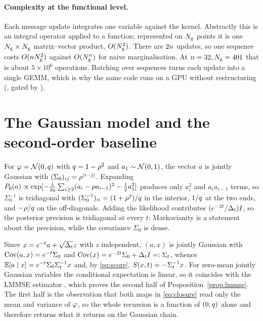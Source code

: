 \paragraph{Complexity at the functional level.} Each message update integrates one variable
against the kernel. Abstractly this is an integral operator applied to a function; represented on
$N_{\mathrm{g}}$ points it is one $N_{\mathrm{g}}\times N_{\mathrm{g}}$ matrix--vector product, $O(N_{\mathrm{g}}^2)$. There are
$2n$ updates, so one sequence costs $O(nN_{\mathrm{g}}^2)$ against $O(N_{\mathrm{g}}^{n})$ for
naive marginalisation. At $n=32,N_{\mathrm{g}}=401$ that is about $5\times10^6$ operations.
Batching over sequences turns each update into a single GEMM, which is why the same code runs on
a GPU without restructuring (, gated by
).

\section{The Gaussian model and the second-order baseline}
\label{app:lmmse}

For $\varphi=\mathcal{N}\!\left(0,q\right)$ with $q=1-\rho^2$ and $a_1\sim\mathcal{N}\!\left(0,1\right)$, the vector $a$
is jointly Gaussian with $(\Sigma_0)_{ij}=\rho^{|i-j|}$. Expanding
$P_0(a)\propto\exp[-\tfrac{1}{2q}\sum_{i\ge2}(a_i-\rho a_{i-1})^2 - \tfrac12 a_1^2]$
produces only $a_i^2$ and $a_ia_{i-1}$ terms, so $\Sigma_0^{-1}$ is tridiagonal with
$(\Sigma_0^{-1})_{ii} = (1+\rho^2)/q$ in the interior, $1/q$ at the two ends, and
$-\rho/q$ on the off-diagonals. Adding the likelihood contributes $(e^{-2t}/\Delta_t)I$, so the
posterior precision is tridiagonal at every $t$: Markovianity is a statement about the precision,
while the covariance $\Sigma_0$ is dense.

Since $x = e^{-t}a + \sqrt{\Delta_t}z$ with $z$ independent, $(a,x)$ is jointly Gaussian with
$\operatorname{Cov}(a,x) = e^{-t}\Sigma_0$ and $\operatorname{Cov}(x) = e^{-2t}\Sigma_0 + \Delta_t I =: \Sigma_t$, whence
$\mathbb{E}[a\mid x] = e^{-t}\Sigma_0\Sigma_t^{-1}x$ and, by \eqref{eq:score},
$S(x,t) = -\Sigma_t^{-1}x$. For zero-mean jointly Gaussian variables the conditional
expectation is linear, so it coincides with the LMMSE estimator \citep{kay1993}, which proves the
second half of Proposition~\ref{prop:lmmse}. The first half is the observation that both maps in
\eqref{eq:closure} read only the mean and variance of $\varphi$, so the whole recursion is a
function of $(0,q)$ alone and therefore returns what it returns on the Gaussian chain.

